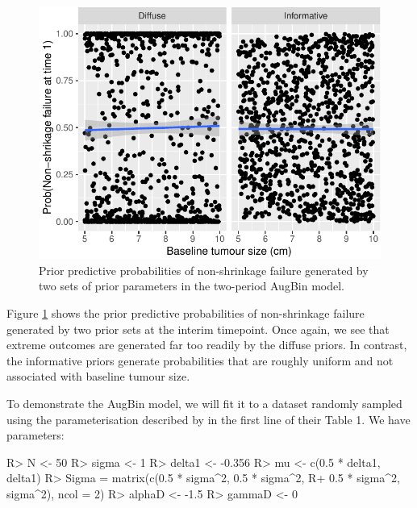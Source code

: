 \documentclass[article]{jss}
\begin{document}
\begin{CodeChunk}
\begin{figure}

{\centering \includegraphics{trialr_files/figure-latex/augbin_prior_pred_nsf-1} 

}

\caption[Prior predictive probabilities of non-shrinkage failure generated by two sets of prior parameters in the two-period AugBin model]{Prior predictive probabilities of non-shrinkage failure generated by two sets of prior parameters in the two-period AugBin model.}\label{fig:augbin_prior_pred_nsf}
\end{figure}
\end{CodeChunk}

Figure \ref{fig:augbin_prior_pred_nsf} shows the prior predictive
probabilities of non-shrinkage failure generated by two prior sets at
the interim timepoint. Once again, we see that extreme outcomes are
generated far too readily by the diffuse priors. In contrast, the
informative priors generate probabilities that are roughly uniform and
not associated with baseline tumour size.

To demonstrate the AugBin model, we will fit it to a dataset randomly
sampled using the parameterisation described by \citet{Wason2013} in the
first line of their Table 1. We have parameters:

\begin{CodeChunk}

\begin{CodeInput}
R> N <- 50
R> sigma <- 1
R> delta1 <- -0.356
R> mu <- c(0.5 * delta1, delta1)
R> Sigma = matrix(c(0.5 * sigma^2, 0.5 * sigma^2, 
R+                  0.5 * sigma^2, sigma^2), ncol = 2)
R> alphaD <- -1.5
R> gammaD <- 0
\end{CodeInput}
\end{CodeChunk}
\end{document}
